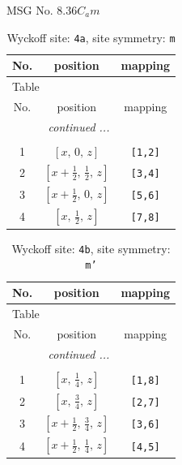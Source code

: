 \documentclass[fleqn,8pt]{jsarticle}
\begin{document}
\setcounter{MaxMatrixCols}{32}

\renewcommand{\tablename}{Table~}
\renewcommand{\figurename}{Figure~}
\begin{center}
\LARGE
MSG No. 8.36\quad$C_{a}m$
\end{center}
\renewcommand{\arraystretch}{1.2}
\begin{longtable}{ccc}
\caption{Wyckoff site: {\tt 4a}, site symmetry: {\tt m}}
 \\
 \hline \hline
No. & position & mapping \\ \hline \endfirsthead

\multicolumn{2}{l}{\tablename\ \thetable{}} \\
 \hline \hline
No. & position & mapping \\ \hline \endhead

 \hline \hline
\multicolumn{2}{r}{\footnotesize\it continued ...} \\ \endfoot

 \hline \hline
\multicolumn{2}{r}{} \\ \endlastfoot

1 & $\left[ x,\, 0,\, z \right]$ & {\tt [1,2]} \\ \hline
2 & $\left[ x + \frac{1}{2},\, \frac{1}{2},\, z \right]$ & {\tt [3,4]} \\ \hline
3 & $\left[ x + \frac{1}{2},\, 0,\, z \right]$ & {\tt [5,6]} \\ \hline
4 & $\left[ x,\, \frac{1}{2},\, z \right]$ & {\tt [7,8]} \\
\end{longtable}
\renewcommand{\arraystretch}{1.2}
\begin{longtable}{ccc}
\caption{Wyckoff site: {\tt 4b}, site symmetry: {\tt m'}}
 \\
 \hline \hline
No. & position & mapping \\ \hline \endfirsthead

\multicolumn{2}{l}{\tablename\ \thetable{}} \\
 \hline \hline
No. & position & mapping \\ \hline \endhead

 \hline \hline
\multicolumn{2}{r}{\footnotesize\it continued ...} \\ \endfoot

 \hline \hline
\multicolumn{2}{r}{} \\ \endlastfoot

1 & $\left[ x,\, \frac{1}{4},\, z \right]$ & {\tt [1,8]} \\ \hline
2 & $\left[ x,\, \frac{3}{4},\, z \right]$ & {\tt [2,7]} \\ \hline
3 & $\left[ x + \frac{1}{2},\, \frac{3}{4},\, z \right]$ & {\tt [3,6]} \\ \hline
4 & $\left[ x + \frac{1}{2},\, \frac{1}{4},\, z \right]$ & {\tt [4,5]} \\
\end{longtable}
\end{document}
